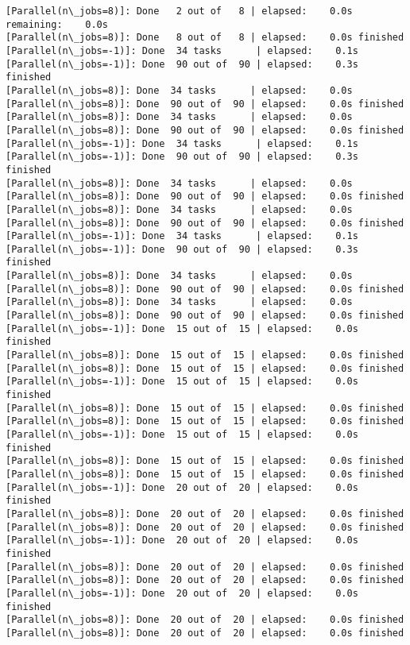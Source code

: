 \documentclass[11pt]{article}
\begin{document}
\begin{Verbatim}[commandchars=\\\{\}]
[Parallel(n\_jobs=8)]: Done   2 out of   8 | elapsed:    0.0s remaining:    0.0s
[Parallel(n\_jobs=8)]: Done   8 out of   8 | elapsed:    0.0s finished
[Parallel(n\_jobs=-1)]: Done  34 tasks      | elapsed:    0.1s
[Parallel(n\_jobs=-1)]: Done  90 out of  90 | elapsed:    0.3s finished
[Parallel(n\_jobs=8)]: Done  34 tasks      | elapsed:    0.0s
[Parallel(n\_jobs=8)]: Done  90 out of  90 | elapsed:    0.0s finished
[Parallel(n\_jobs=8)]: Done  34 tasks      | elapsed:    0.0s
[Parallel(n\_jobs=8)]: Done  90 out of  90 | elapsed:    0.0s finished
[Parallel(n\_jobs=-1)]: Done  34 tasks      | elapsed:    0.1s
[Parallel(n\_jobs=-1)]: Done  90 out of  90 | elapsed:    0.3s finished
[Parallel(n\_jobs=8)]: Done  34 tasks      | elapsed:    0.0s
[Parallel(n\_jobs=8)]: Done  90 out of  90 | elapsed:    0.0s finished
[Parallel(n\_jobs=8)]: Done  34 tasks      | elapsed:    0.0s
[Parallel(n\_jobs=8)]: Done  90 out of  90 | elapsed:    0.0s finished
[Parallel(n\_jobs=-1)]: Done  34 tasks      | elapsed:    0.1s
[Parallel(n\_jobs=-1)]: Done  90 out of  90 | elapsed:    0.3s finished
[Parallel(n\_jobs=8)]: Done  34 tasks      | elapsed:    0.0s
[Parallel(n\_jobs=8)]: Done  90 out of  90 | elapsed:    0.0s finished
[Parallel(n\_jobs=8)]: Done  34 tasks      | elapsed:    0.0s
[Parallel(n\_jobs=8)]: Done  90 out of  90 | elapsed:    0.0s finished
[Parallel(n\_jobs=-1)]: Done  15 out of  15 | elapsed:    0.0s finished
[Parallel(n\_jobs=8)]: Done  15 out of  15 | elapsed:    0.0s finished
[Parallel(n\_jobs=8)]: Done  15 out of  15 | elapsed:    0.0s finished
[Parallel(n\_jobs=-1)]: Done  15 out of  15 | elapsed:    0.0s finished
[Parallel(n\_jobs=8)]: Done  15 out of  15 | elapsed:    0.0s finished
[Parallel(n\_jobs=8)]: Done  15 out of  15 | elapsed:    0.0s finished
[Parallel(n\_jobs=-1)]: Done  15 out of  15 | elapsed:    0.0s finished
[Parallel(n\_jobs=8)]: Done  15 out of  15 | elapsed:    0.0s finished
[Parallel(n\_jobs=8)]: Done  15 out of  15 | elapsed:    0.0s finished
[Parallel(n\_jobs=-1)]: Done  20 out of  20 | elapsed:    0.0s finished
[Parallel(n\_jobs=8)]: Done  20 out of  20 | elapsed:    0.0s finished
[Parallel(n\_jobs=8)]: Done  20 out of  20 | elapsed:    0.0s finished
[Parallel(n\_jobs=-1)]: Done  20 out of  20 | elapsed:    0.0s finished
[Parallel(n\_jobs=8)]: Done  20 out of  20 | elapsed:    0.0s finished
[Parallel(n\_jobs=8)]: Done  20 out of  20 | elapsed:    0.0s finished
[Parallel(n\_jobs=-1)]: Done  20 out of  20 | elapsed:    0.0s finished
[Parallel(n\_jobs=8)]: Done  20 out of  20 | elapsed:    0.0s finished
[Parallel(n\_jobs=8)]: Done  20 out of  20 | elapsed:    0.0s finished

\end{Verbatim}
\end{document}
